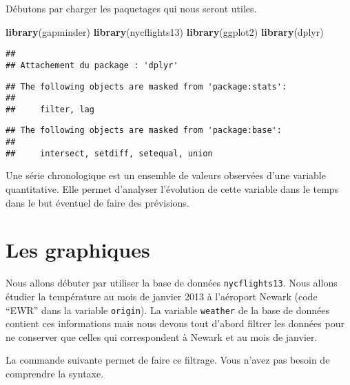\documentclass[]{book}
\newenvironment{Shaded}{\begin{snugshade}}{\end{snugshade}}
\newcommand{\KeywordTok}[1]{\textcolor[rgb]{0.13,0.29,0.53}{\textbf{#1}}}
\newcommand{\DecValTok}[1]{\textcolor[rgb]{0.00,0.00,0.81}{#1}}
\newcommand{\StringTok}[1]{\textcolor[rgb]{0.31,0.60,0.02}{#1}}
\newcommand{\OperatorTok}[1]{\textcolor[rgb]{0.81,0.36,0.00}{\textbf{#1}}}
\newcommand{\NormalTok}[1]{#1}
\begin{document}
Débutons par charger les paquetages qui nous seront utiles.

\begin{Shaded}
\begin{Highlighting}[]
\KeywordTok{library}\NormalTok{(gapminder)}
\KeywordTok{library}\NormalTok{(nycflights13)}
\KeywordTok{library}\NormalTok{(ggplot2)}
\KeywordTok{library}\NormalTok{(dplyr)}
\end{Highlighting}
\end{Shaded}

\begin{verbatim}
## 
## Attachement du package : 'dplyr'
\end{verbatim}

\begin{verbatim}
## The following objects are masked from 'package:stats':
## 
##     filter, lag
\end{verbatim}

\begin{verbatim}
## The following objects are masked from 'package:base':
## 
##     intersect, setdiff, setequal, union
\end{verbatim}

Une série chronologique est un ensemble de valeurs observées d'une
variable quantitative. Elle permet d'analyser l'évolution de cette
variable dans le temps dans le but éventuel de faire des prévisions.

\section{Les graphiques}\label{les-graphiques}

Nous allons débuter par utiliser la base de données
\texttt{nycflights13}. Nous allons étudier la température au mois de
janvier 2013 à l'aéroport Newark (code ``EWR'' dans la variable
\texttt{origin}). La variable \texttt{weather} de la base de données
contient ces informations mais nous devons tout d'abord filtrer les
données pour ne conserver que celles qui correspondent à Newark et au
mois de janvier.

La commande suivante permet de faire ce filtrage. Vous n'avez pas besoin
de comprendre la syntaxe.

\begin{Shaded}
\end{Shaded}
\end{document}
